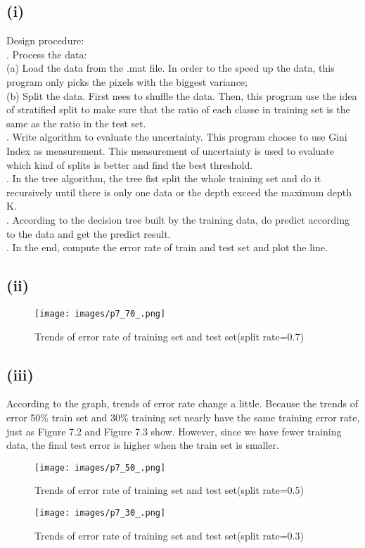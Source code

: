 \documentclass[twoside,11pt]{homework}
\begin{document}
\subsection*{(i)}
Design procedure:\\
. Process the data:\\
\indent\indent(a) Load the data from the .mat file. In order to the speed up the data, this program only picks the pixels with the biggest variance;\\
\indent\indent(b) Split the data. First nees to shuffle the data. Then, this program use the idea of stratified split to make sure that the ratio of each classe in training set is the same as the ratio in the test set.\\
. Write algorithm to evaluate the uncertainty. This program choose to use Gini Index as measurement. This measurement of uncertainty is used to evaluate which kind of splits is better and find the best threshold. \\
. In the tree algorithm, the tree fist split the whole training set and do it recursively until there is only one data or the depth exceed the maximum depth K.\\
. According to the decision tree built by the training data, do predict according to the data and get the predict result.\\
. In the end, compute the error rate of train and test set and plot the line.\\

\subsection*{(ii)}
\begin{figure}[H]
\centering\texttt{[image: images/p7\_70\_.png]}
\caption{Trends of error rate of training set and test set(split rate=0.7)}
\label{fig:Trends of error rate of training set and test set(split rate=0.7)}
\end{figure}

\subsection*{(iii)}
According to the graph, trends of error rate change a little. Because the trends of error 50\% train set and 30\% training set nearly have the same training error rate, just as Figure 7.2 and Figure 7.3 show. However, since we have fewer training data, the final test error is higher when the train set is smaller. 
\begin{figure}[H]
\centering\texttt{[image: images/p7\_50\_.png]}
\caption{Trends of error rate of training set and test set(split rate=0.5)}
\label{fig:Trends of error rate of training set and test set(split rate=0.5)}
\end{figure}
\begin{figure}[H]
\centering\texttt{[image: images/p7\_30\_.png]}
\caption{Trends of error rate of training set and test set(split rate=0.3)}
\label{fig:Trends of error rate of training set and test set(split rate=0.3)}
\end{figure}
	
\end{document}
